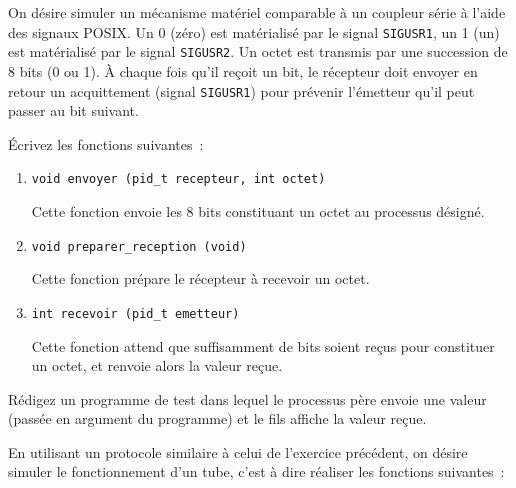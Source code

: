 \question

On désire simuler un mécanisme matériel comparable à un coupleur série
à l'aide des signaux POSIX. Un 0 (zéro) est matérialisé par le signal
{\tt SIGUSR1}, un 1 (un) est matérialisé par le signal {\tt SIGUSR2}.
Un octet est transmis par une succession de 8 bits (0 ou 1).
À chaque fois qu'il reçoit un bit, le récepteur doit envoyer en
retour un acquittement (signal {\tt SIGUSR1}) pour prévenir l'émetteur
qu'il peut passer au bit suivant.

Écrivez les fonctions suivantes~:

\begin {enumerate}
    \item \verb:void envoyer (pid_t recepteur, int octet):

	Cette fonction envoie les 8 bits constituant un octet au
	processus désigné.

    \item \verb:void preparer_reception (void):

	Cette fonction prépare le récepteur à recevoir un octet.

    \item \verb:int recevoir (pid_t emetteur):

	Cette fonction attend que suffisamment de bits soient reçus
	pour constituer un octet,  et renvoie alors la valeur reçue.

\end {enumerate}

Rédigez un programme de test dans lequel le processus père envoie
une valeur (passée en argument du programme) et le fils affiche la
valeur reçue.


\question

En utilisant un protocole similaire à celui de l'exercice précédent,
on désire simuler le fonctionnement d'un tube, c'est à dire réaliser
les fonctions suivantes~:

